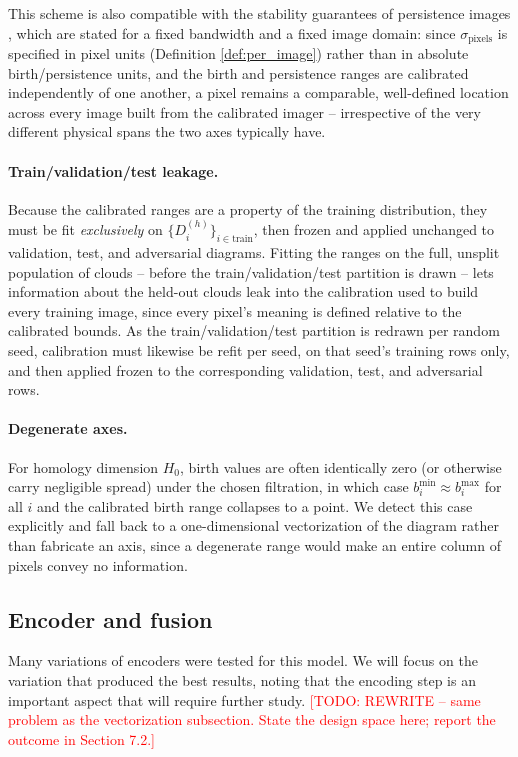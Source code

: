 \documentclass[11pt,letterpaper]{article}
\newcommand{\1}{\mathds{1}}
\newcommand{\todo}[1]{\textcolor{red}{[TODO: #1]}}
\newcommand{\todo}[1]{}
\theoremstyle{plain}
\theoremstyle{definitioncolon}
\begin{document}
This scheme is also compatible with the stability guarantees of persistence
images \citep{adams2017persistence}, which are stated for a fixed bandwidth and a
fixed image domain: since $\sigma_{\text{pixels}}$ is specified in pixel units
(Definition \ref{def:per_image}) rather than in absolute birth/persistence units,
and the birth and persistence ranges are calibrated independently of one another,
a pixel remains a comparable, well-defined location across every image built from
the calibrated imager -- irrespective of the very different physical spans the
two axes typically have.

\paragraph{Train/validation/test leakage.}
Because the calibrated ranges are a property of the training distribution, they
must be fit \emph{exclusively} on $\{D_i^{(h)}\}_{i \in \text{train}}$, then
frozen and applied unchanged to validation, test, and adversarial diagrams.
Fitting the ranges on the full, unsplit population of clouds -- before the
train/validation/test partition is drawn -- lets information about the held-out
clouds leak into the calibration used to build every training image, since every
pixel's meaning is defined relative to the calibrated bounds. As the
train/validation/test partition is redrawn per random seed, calibration must
likewise be refit per seed, on that seed's training rows only, and then applied
frozen to the corresponding validation, test, and adversarial rows.

\paragraph{Degenerate axes.}
For homology dimension $H_0$, birth values are often identically zero (or
otherwise carry negligible spread) under the chosen filtration, in which case
$b_i^{\min} \approx b_i^{\max}$ for all $i$ and the calibrated birth range
collapses to a point. We detect this case explicitly and fall back to a
one-dimensional vectorization of the diagram rather than fabricate an axis, since
a degenerate range would make an entire column of pixels convey no information.

\subsection{Encoder and fusion}
Many variations of encoders were tested for this model. We will focus on the
variation that produced the best results, noting that the encoding step is an
important aspect that will require further study.
\todo{REWRITE -- same problem as the vectorization subsection. State the design
space here; report the outcome in Section 7.2.}
\end{document}
